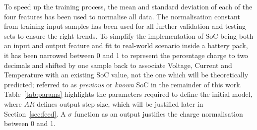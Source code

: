 %
%
{To speed up the training process, the mean and standard deviation of each of the four features has been used to normalise all data.}
The normalisation constant from training input samples has been used for all further validation and testing sets to ensure the right trends.
To simplify the implementation of SoC being both an input and output feature and fit to real-world scenario inside a battery pack, it has been narrowed between 0 and 1 to represent the percentage charge to two decimals and shifted by one sample back to associate Voltage, Current and Temperature with an existing SoC value, not the one which will be theoretically predicted; referred to as \textit{previous} or \textit{known} SoC in the remainder of this work.
\mbox{Table~\ref{tab:params}} highlights the parameters required to define the initial model, where $AR$ defines output step size, which will be justified later in Section~\ref{sec:feed}.
A $\sigma$ function as an output justifies the charge normalisation between 0 and 1.
